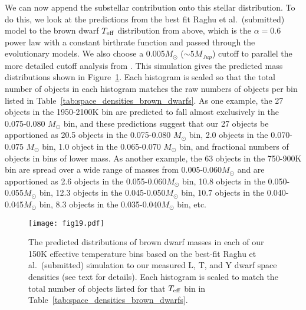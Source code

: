 \documentclass[twocolumn,tighten,twocolappendix]{aastex631}
\begin{document}
We can now append the substellar contribution onto this stellar distribution. To do this, we look at the predictions from the best fit Raghu et al.\ (submitted) model to the brown dwarf $T_{\rm eff}$ distribution from above, which is the $\alpha=0.6$ power law with a constant birthrate function and passed through the \cite{saumon2008} evolutionary models. We also choose a 0.005$M_\odot$ ($\sim5M_{Jup}$) cutoff to parallel the more detailed cutoff analysis from \cite{kirkpatrick2021}. This simulation gives the predicted mass distributions shown in Figure~\ref{fig:brown_dwarf_mass_distribution_alpha06_constant_5MJup_SM08}. Each histogram is scaled so that the total number of objects in each histogram matches the raw numbers of objects per bin listed in Table~\ref{tab:space_densities_brown_dwarfs}. As one example, the 27 objects in the 1950-2100K bin are predicted to fall almost exclusively in the 0.075-0.080 $M_\odot$ bin, and these predictions suggest that our 27 objects be apportioned as 20.5 objects in the 0.075-0.080 $M_\odot$ bin, 2.0 objects in the 0.070-0.075 $M_\odot$ bin, 1.0 object in the 0.065-0.070 $M_\odot$ bin, and fractional numbers of objects in bins of lower mass. As another example, the 63 objects in the 750-900K bin are spread over a wide range of masses from 0.005-0.060$M_\odot$ and are apportioned as 2.6 objects in the 0.055-0.060$M_\odot$ bin, 10.8 objects in the 0.050-0.055$M_\odot$ bin, 12.3 objects in the 0.045-0.050$M_\odot$ bin, 10.7 objects in the 0.040-0.045$M_\odot$ bin, 8.3 objects in the 0.035-0.040$M_\odot$ bin, etc.

\begin{figure}
\texttt{[image: fig19.pdf]}
\caption{The predicted distributions of brown dwarf masses in each of our 150K effective temperature bins based on the best-fit Raghu et al.\ (submitted) simulation to our measured L, T, and Y dwarf space densities (see text for details). Each histogram is scaled to match the total number of objects listed for that $T_{\rm eff}$ bin in Table~\ref{tab:space_densities_brown_dwarfs}.
\label{fig:brown_dwarf_mass_distribution_alpha06_constant_5MJup_SM08}}
\end{figure}
\end{document}
